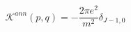 \begin{equation}
\mathcal{K}^{ann}\left( p,q\right) =-\frac{2\pi e^{2}}{m^{2}}\delta _{J-1,0}
\end{equation}

